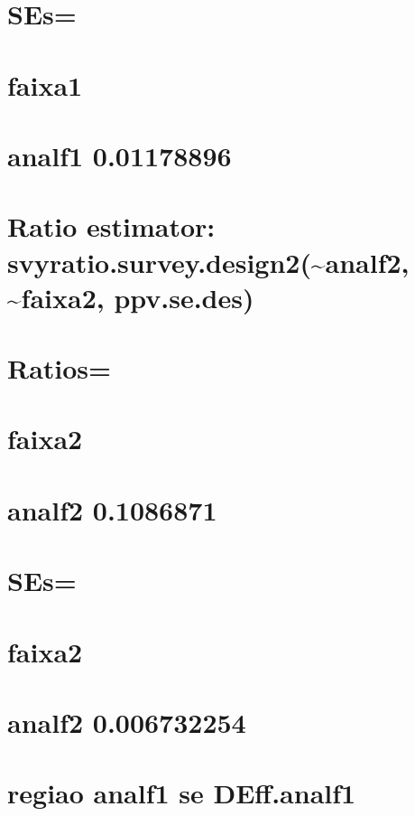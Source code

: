 \documentclass[]{book}
\theoremstyle{definition}
\theoremstyle{definition}
\theoremstyle{definition}
\theoremstyle{remark}
\begin{document}
\section{SEs=}\label{ses}

\section{faixa1}\label{faixa1-1}

\section{analf1 0.01178896}\label{analf1-0.01178896}

\section{Ratio estimator:
svyratio.survey.design2(\textasciitilde{}analf2,
\textasciitilde{}faixa2,
ppv.se.des)}\label{ratio-estimator-svyratio.survey.design2analf2-faixa2-ppv.se.des}

\section{Ratios=}\label{ratios-1}

\section{faixa2}\label{faixa2}

\section{analf2 0.1086871}\label{analf2-0.1086871}

\section{SEs=}\label{ses-1}

\section{faixa2}\label{faixa2-1}

\section{analf2 0.006732254}\label{analf2-0.006732254}

\section{regiao analf1 se
DEff.analf1}\label{regiao-analf1-se-deff.analf1}
\end{document}
